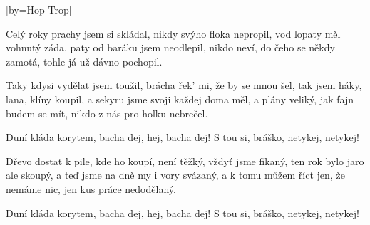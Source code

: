 [by={Hop Trop}]

\beginverse{}
Celý roky prachy jsem si skládal,
nikdy svýho floka nepropil,
vod lopaty měl vohnutý záda,
paty od baráku jsem neodlepil,
nikdo neví, do čeho se někdy zamotá,
tohle já už dávno pochopil.
\endverse{}

\beginverse{}
\chordsoff{}
Taky kdysi vydělat jsem toužil,
brácha řek' mi, že by se mnou šel,
tak jsem háky, lana, klíny koupil,
a sekyru jsme svoji každej doma měl,
a plány veliký, jak fajn budem se mít,
nikdo z nás pro holku nebrečel.
\chordson{}
\endverse{}

\beginchorus{}
Duní kláda korytem, bacha dej, hej, bacha dej!
S tou si, bráško, netykej, netykej!
\endchorus{}

\beginverse{}
\chordsoff{}
Dřevo dostat k pile, kde ho koupí,
není těžký, vždyť jsme fikaný,
ten rok bylo jaro ale skoupý,
a teď jsme na dně my i vory svázaný,
a k tomu můžem říct jen, že nemáme nic,
jen kus práce nedodělaný.
\chordson{}
\endverse{}

\beginchorus{}
\chordsoff{}
\lrep{} Duní kláda korytem, bacha dej, hej, bacha dej!
S tou si, bráško, netykej, netykej! \rrep{} 
\chordson{}
\endchorus{}

\endsong{}
